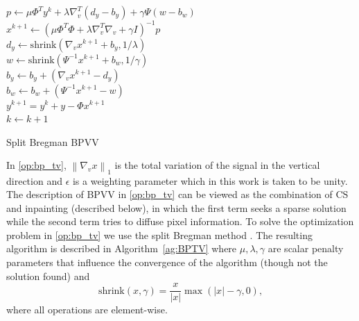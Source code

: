 \documentclass[twocolumn,twoside]{IEEEtran/IEEEtran}
\begin{document}
\begin{algorithm}
   
		
   {
     {
      $p\leftarrow\mu\Phi^Ty^k+\lambda\nabla_v^T\left(d_y-b_y\right)+\gamma\Psi\left(w-b_w\right)$\\
      $x^{k+1}\leftarrow \left(\mu\Phi^{T}\Phi+\lambda\nabla_v^T\nabla_v+\gamma I\right)^{-1}p$\\
      $d_y\leftarrow \text{shrink}(\nabla_vx^{k+1}+b_y,1/\lambda)$\\
      $w\leftarrow \text{shrink}\left(\Psi^{-1}x^{k+1}+b_w,1/\gamma\right)$\\
      $b_y\leftarrow b_y+\left(\nabla_vx^{k+1}-d_y\right)$\\
      $b_w\leftarrow b_w+\left(\Psi^{-1}x^{k+1}-w\right)$\\
    }
    $y^{k+1} = y^k + y - \Phi x^{k+1}$\\
    $k \leftarrow k + 1$\\
  } 
  \caption{Split Bregman BPVV}
  \label{ag:BPTV}
\end{algorithm}

In \eqref{op:bp_tv}, $\left \| \nabla_v x \right \|_1$ is the total variation of
the signal in the vertical direction and $\epsilon$ is a weighting parameter
which in this work is taken to be unity. The description of BPVV in
\eqref{op:bp_tv} can be viewed as the combination of CS and inpainting
(described below), in which the first term seeks a sparse solution while the
second term tries to diffuse pixel information. To solve the optimization
problem in \eqref{op:bp_tv} we use the split Bregman method
\cite{goldstein2009split}. The resulting algorithm is described in
Algorithm~\ref{ag:BPTV} where $\mu, \lambda, \gamma$ are scalar penalty
parameters that influence the convergence of the algorithm (though not the
solution found) and
\begin{equation}\label{df:shrink}
  \text{shrink}(x,\gamma) = \frac{x}{|x|}\max\left(|x|-\gamma,0\right),
\end{equation}
where all operations are element-wise.
\end{document}
